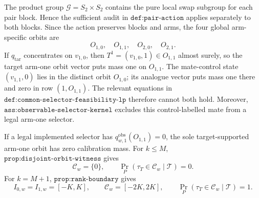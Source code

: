 The product group \(\mathcal G=S_2\times S_2\) contains the pure local swap subgroup for each pair block. Hence the sufficient audit in \(\texttt{def:pair-action}\) applies separately to both blocks. Since the action preserves blocks and arms, the four global arm-specific orbits are
\[
O_{1,0},\quad O_{1,1},\quad O_{2,0},\quad O_{2,1}.
\tag{1}
\]
If \(q_{\mathrm{tar}}\) concentrates on \(v_{1,0}\), then \(T^1=(v_{1,0},1)\in O_{1,1}\) almost surely, so the target arm-one orbit vector puts mass one on \(O_{1,1}\). The mate-control state \((v_{1,1},0)\) lies in the distinct orbit \(O_{1,0}\); its analogue vector puts mass one there and zero in row \((1,O_{1,1})\). The relevant equations in \(\texttt{def:common-selector-feasibility-lp}\) therefore cannot both hold. Moreover, \(\texttt{ass:observable-selector-kernel}\) excludes this control-labelled mate from a legal arm-one selector.

If a legal implemented selector has \(q^{\mathrm{obs}}_{w,1}(O_{1,1})=0\), the sole target-supported arm-one orbit has zero calibration mass. For \(k\le M\), \(\texttt{prop:disjoint-orbit-witness}\) gives
\[
\mathcal C_w=\{0\},\qquad \Pr_P(\tau_T\in\mathcal C_w\mid\mathcal T)=0.
\tag{2}
\]
For \(k=M+1\), \(\texttt{prop:rank-boundary}\) gives
\[
I_{0,w}=I_{1,w}=[-K,K],\qquad \mathcal C_w=[-2K,2K],\qquad \Pr_P(\tau_T\in\mathcal C_w\mid\mathcal T)=1.
\tag{3}
\]